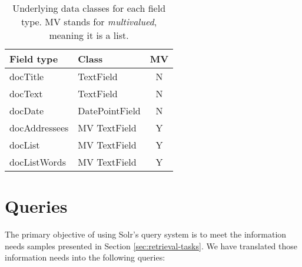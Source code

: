 \documentclass[sigconf, authorversion]{acmart}
\begin{document}
\begin{table}[ht]
    \centering
    \caption{Underlying data classes for each field type. MV stands for \textit{multivalued}, meaning it is a list.} \label{tab:classes}
    \begin{tabular}{@{}l|l c@{}}
        \textbf{Field type} & \textbf{Class} & \textbf{MV} \\ \hline
        docTitle      & TextField      & N \\
        docText       & TextField      & N \\
        docDate       & DatePointField & N \\
        docAddressees & MV TextField   & Y \\
        docList       & MV TextField   & Y \\
        docListWords  & MV TextField   & Y \\
    \end{tabular}
\end{table}

\section{Queries}

The primary objective of using Solr's query system is to meet the information needs samples presented in Section \ref{sec:retrieval-tasks}. We have translated those information needs into the following queries:
\end{document}
